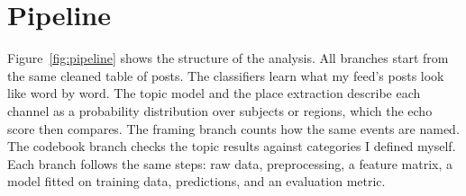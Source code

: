 \documentclass[11pt,a4paper]{article}
\begin{document}
\section{Pipeline}
\label{sec:pipeline}

Figure~\ref{fig:pipeline} shows the structure of the analysis. All branches start from the same cleaned table of posts. The classifiers learn what my feed's posts look like word by word. The topic model and the place extraction describe each channel as a probability distribution over subjects or regions, which the echo score then compares. The framing branch counts how the same events are named. The codebook branch checks the topic results against categories I defined myself. Each branch follows the same steps: raw data, preprocessing, a feature matrix, a model fitted on training data, predictions, and an evaluation metric.
\end{document}
